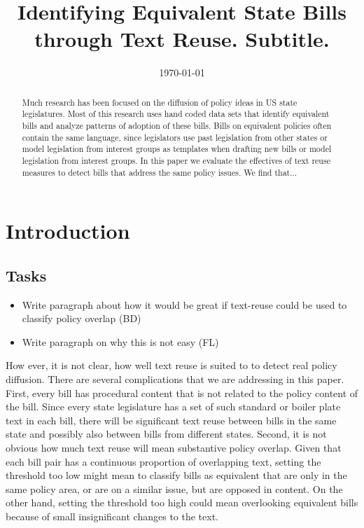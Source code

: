 \documentclass[12pt]{article} %
\begin{document}
 

\title{Identifying Equivalent State Bills through Text Reuse. \large Subtitle.}
\date{\today}
\author{}

\maketitle

\begin{abstract}
Much research has been focused on the diffusion of policy ideas in US state
legislatures. Most of this research uses hand coded data sets that identify
equivalent bills and analyze patterns of adoption of these bills. Bills on
equivalent policies often contain the same language, since legislators use past
legislation from other states or model legislation from interest groups as
templates when drafting new bills or model legislation from interest groups. In
this paper we evaluate the effectives of text reuse measures to detect bills
that address the same policy issues. We find that... 
\end{abstract}

\section{Introduction}

\subsection{Tasks}
\begin{itemize}
\item Write paragraph about how it would be great if text-reuse could be used to classify policy overlap (BD)
\item Write paragraph on why this is not easy (FL)
\end{itemize}
How ever, it is not clear, how well text reuse is suited to to detect real
policy diffusion. There are several complications that we are addressing in this
paper. First, every bill has procedural content that is not related to the
policy content of the bill. Since every state legislature has a set of such
standard or boiler plate text in each bill, there will be significant text reuse
between bills in the same state and possibly also between bills from different
states. Second, it is not obvious how much text reuse will mean substantive
policy overlap. Given that each bill pair has a continuous proportion of
overlapping text, setting the threshold too low might mean to classify bills as
equivalent that are only in the same policy area, or are on a similar issue, but
are opposed in content. On the other hand, setting the threshold too high could
mean overlooking equivalent bills because of small insignificant changes to the
text. 
\end{document}
